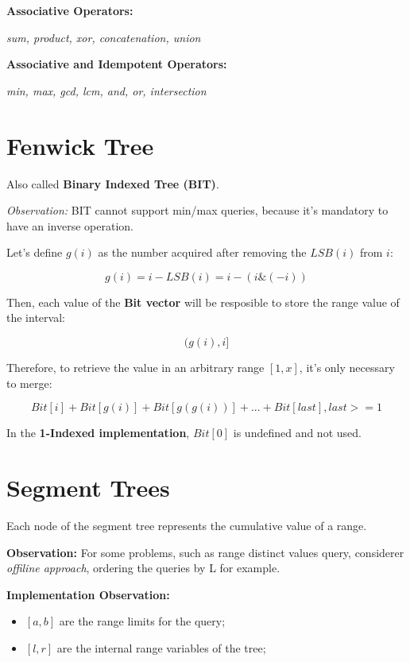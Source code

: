     \textbf{Associative Operators:}

    \textit{sum, product, xor, concatenation, union}

    \textbf{Associative and Idempotent Operators:}

    \textit{min, max, gcd, lcm, and, or, intersection}


\section{Fenwick Tree}

    Also called \textbf{Binary Indexed Tree (BIT)}.

    \textit{Observation:} BIT cannot support min/max queries, because it's mandatory to have an inverse operation.

    Let's define $g(i)$ as the number acquired after removing the $LSB(i)$ from $i$:

        $$ g(i) = i - LSB(i) = i - (i \& (-i)) $$

    Then, each value of the \textbf{Bit vector} will be resposible to store the range value of the interval:

        $$ (g(i), i] $$

    Therefore, to retrieve the value in an arbitrary range $[1, x]$, it's only necessary to merge:

        $$ Bit[i] + Bit[g(i)] + Bit[g(g(i))] + ... + Bit[last], last >= 1$$

    In the \textbf{1-Indexed implementation}, $Bit[0]$ is undefined and not used.

    

\section{Segment Trees}

    Each node of the segment tree represents the cumulative value of a range.

    \textbf{Observation:} For some problems, such as range distinct values query,
    considerer \textit{offiline approach}, ordering the queries by L for example. 

    \textbf{Implementation Observation:}
    \begin{itemize}
    \item $[a, b]$ are the range limits for the query;
    \item $[l, r]$ are the internal range variables of the tree;
    \end{itemize}

